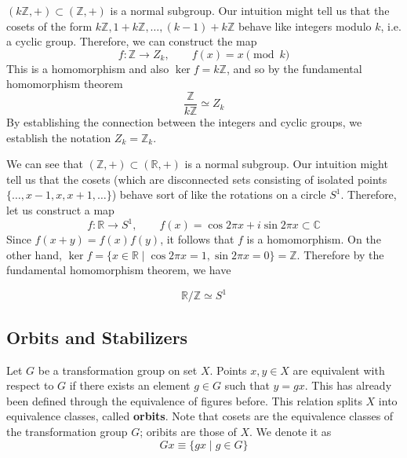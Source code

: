   \begin{example}
    $(k \mathbb{Z}, +) \subset (\mathbb{Z}, +)$ is a normal subgroup. Our intuition might tell us that the cosets of the form $k \mathbb{Z}, 1 + k \mathbb{Z}, \ldots, (k-1) + k\mathbb{Z}$ behave like integers modulo $k$, i.e. a cyclic group. Therefore, we can construct the map 
    \begin{equation}
      f: \mathbb{Z} \to Z_k, \qquad f(x) = x \pmod{k}
    \end{equation} 
    This is a homomorphism and also $\ker{f} = k \mathbb{Z}$, and so by the fundamental homomorphism theorem 
    \begin{equation}
      \frac{\mathbb{Z}}{k \mathbb{Z}} \simeq Z_k 
    \end{equation}
    By establishing the connection between the integers and cyclic groups, we establish the notation $Z_k = \mathbb{Z}_k$. 
  \end{example}

  \begin{example}
    We can see that $(\mathbb{Z}, +) \subset (\mathbb{R}, +)$ is a normal subgroup. Our intuition might tell us that the cosets (which are disconnected sets consisting of isolated points $\{\ldots, x - 1, x, x + 1, \ldots\}$) behave sort of like the rotations on a circle $S^1$. Therefore, let us construct a map 
    \begin{equation}
      f: \mathbb{R} \to S^1, \qquad f(x) = \cos{2\pi x} + i \sin{2\pi x} \subset \mathbb{C}
    \end{equation}
    Since $f(x + y) = f(x) f(y)$, it follows that $f$ is a homomorphism. On the other hand, $\ker{f} = \{ x \in \mathbb{R} \mid \cos{2 \pi x} = 1, \sin{2 \pi x} = 0 \} = \mathbb{Z}$. Therefore by the fundamental homomorphism theorem, we have
     
    \begin{equation}
      \mathbb{R}/\mathbb{Z} \simeq S^1
    \end{equation}
  \end{example}

\subsection{Orbits and Stabilizers}

  \begin{definition}[Orbits]
    Let $G$ be a transformation group on set $X$. Points $x, y \in X$ are equivalent with respect to $G$ if there exists an element $g \in G$ such that $y = g x$. This has already been defined through the equivalence of figures before. This relation splits $X$ into equivalence classes, called \textbf{orbits}. Note that cosets are the equivalence classes of the transformation group $G$; oribits are those of $X$. We denote it as
    \begin{equation}
      Gx \equiv \{ g x \;|\;g \in G \}
    \end{equation}
  \end{definition}

